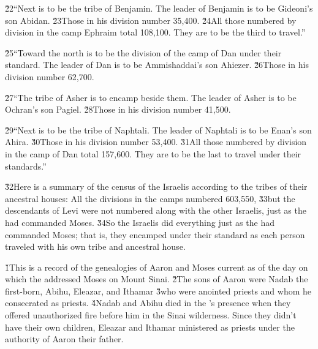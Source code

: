 \v{22}``Next is to be the tribe of Benjamin. The leader of Benjamin is to be Gideoni's son Abidan. \v{23}Those in his division number 35,400. \v{24}All those numbered by division in the camp Ephraim total 108,100. They are to be the third to travel.''

\v{25}``Toward the north is to be the division of the camp of Dan under their standard. The leader of Dan is to be Ammishaddai's son Ahiezer. \v{26}Those in his division number 62,700.

\v{27}``The tribe of Asher is to encamp beside them. The leader of Asher is to be Ochran's son Pagiel. \v{28}Those in his division number 41,500.

\v{29}``Next is to be the tribe of Naphtali. The leader of Naphtali is to be Enan's son Ahira. \v{30}Those in his division number 53,400. \v{31}All those numbered by division in the camp of Dan total 157,600. They are to be the last to travel under their standards.''

\v{32}Here is a summary of the census of the Israelis according to the tribes of their ancestral houses: All the divisions in the camps numbered 603,550, \v{33}but the descendants of Levi were not numbered along with the other Israelis, just as the  had commanded Moses. \v{34}So the Israelis did everything just as the  had commanded Moses; that is, they encamped under their standard as each person traveled with his own tribe and ancestral house.

\v{1}This is a record of the genealogies of Aaron and Moses current as of the day on which the  addressed Moses on Mount Sinai. \v{2}The sons of Aaron were Nadab the first-born, Abihu, Eleazar, and Ithamar \v{3}who were anointed priests and whom he consecrated as priests. \v{4}Nadab and Abihu died in the 's presence when they offered unauthorized fire before him in the Sinai wilderness. Since they didn't have their own children, Eleazar and Ithamar ministered as priests under the authority of Aaron their father.

